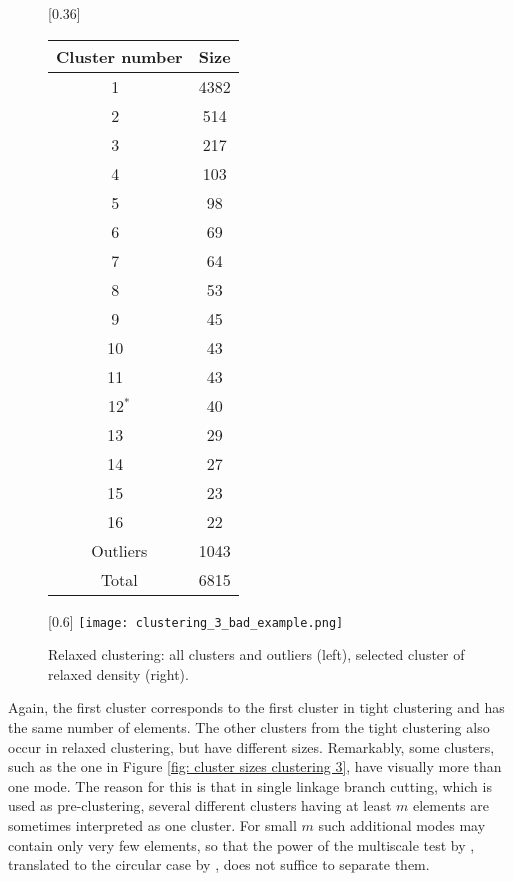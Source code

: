 \documentclass{llncs}
\begin{document}
\begin{figure}[ht!]
        \centering
        [0.36\textwidth]{
        \begin{tabular}{c|c}
            Cluster number & Size  \\
            \hline
            1~ &  4382 \\
            2~ & 514 \\
            3~ & 217 \\
            4~ & 103 \\
            5~ & 98 \\
            6~ & 69 \\
            7~ & 64 \\
            8~ & 53 \\
            9~ & 45 \\
            10~ & 43 \\
            11~ & 43 \\
            12$^*$ & 40 \\
            13~ & 29 \\
            14~ & 27 \\
            15~ & 23 \\
            16~ & 22 \\
            Outliers & 1043\\
           \hline
            Total & 6815
        \end{tabular}
        }
    \hspace*{0.02\textwidth}
    [0.6\textwidth]{
    \texttt{[image: clustering\_3\_bad\_example.png]}
    }
    \caption{Relaxed clustering: all clusters and outliers (left), selected cluster of relaxed density (right).
    }
\end{figure}
Again, the first cluster corresponds to the first cluster in tight clustering and has the same number of elements. The other clusters from the tight clustering also occur in relaxed clustering, but have different sizes. Remarkably, some clusters, such as the one in Figure \ref{fig: cluster sizes clustering 3}, have visually more than one mode. The reason for this is that in single linkage branch cutting, which is used as pre-clustering, several different clusters having at least $m$ elements are sometimes interpreted as one cluster. For small $m$ such additional modes may contain only very few elements, so that the power of the multiscale test by \cite{duembgen2008}, translated to the circular case by \cite{eltzner2018}, does not suffice to separate them.
\end{document}
